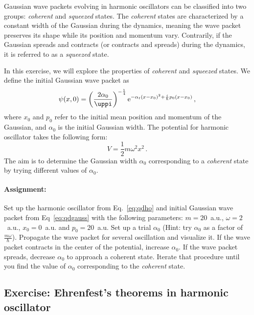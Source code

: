 Gaussian wave packets evolving in harmonic oscillators can be classified into two groups: \textit{coherent} and \textit{squeezed} states. The \textit{coherent} states are characterized by a constant width of the Gaussian during the dynamics, meaning the wave packet preserves its shape while its position and momentum vary. Contrarily, if the Gaussian spreads and contracts (or contracts and spreads) during the dynamics, it is referred to as a \textit{squeezed} state.

In this exercise, we will explore the properties of \textit{coherent} and \textit{squeezed} states. We define the initial Gaussian wave packet as
\begin{equation}
    \psi(x,0) = \left(\frac{2\alpha_0}{\pi}\right)^{-\frac{1}{4}} \e^{-\alpha_t(x-x_0)^2 +\frac{i}{\hbar}p_0(x-x_0)} \, ,
    \label{eq:qdgauss}
\end{equation}
where $x_0$ and $p_0$ refer to the initial mean position and momentum of the Gaussian, and $\alpha_0$ is the initial Gaussian width. The potential for harmonic oscillator takes the following form:
\begin{equation}
    V = \frac{1}{2}m\omega^2x^2 \, .
    \label{eq:qdho}
\end{equation}
The aim is to determine the Gaussian width $\alpha_0$ corresponding to a \textit{coherent} state by trying different values of $\alpha_0$.

\paragraph{Assignment:} Set up the harmonic oscillator from Eq.~\eqref{eq:qdho} and initial Gaussian wave packet from Eq~\eqref{eq:qdgauss} with the following parameters: $m=20$~a.u., $\omega=2$~a.u., $x_0=0$~a.u. and $p_0=20$~a.u. Set up a trial $\alpha_0$ (Hint: try $\alpha_0$ as a factor of $\frac{m\omega}{\hbar}$). Propagate the wave packet for several oscillation and visualize it. If the wave packet contracts in the center of the potential, increase $\alpha_0$. If the wave packet spreads, decrease $\alpha_0$ to approach a coherent state. Iterate that procedure until you find the value of $\alpha_0$ corresponding to the \textit{coherent} state. 

\subsection*{Exercise: Ehrenfest's theorems in harmonic oscillator}

